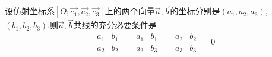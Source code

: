 \begin{enumerate}[1.]
	\addentheorem[共线定理5]
	\quad 设仿射坐标系$[O;\overrightarrow{e_1},\overrightarrow{e_2},\overrightarrow{e_3}]$上的两个向量$\overrightarrow{a},\overrightarrow{b}$的坐标分别是$(a_1,a_2,a_3)$,\\$(b_1,b_2,b_3).$则$\overrightarrow{a},\overrightarrow{b}$共线的充分必要条件是
	\begin{equation}
		\begin{array}{|cc|}
			a_1 & b_1  \\
			a_2 & b_2 
		\end{array}=
		\begin{array}{|cc|}
			a_1 & b_1  \\
			a_3& b_3 
		\end{array}=
		\begin{array}{|cc|}
			a_2 & b_2  \\
			a_3 & b_3 
		\end{array}=0
	\end{equation}
\end{enumerate}

